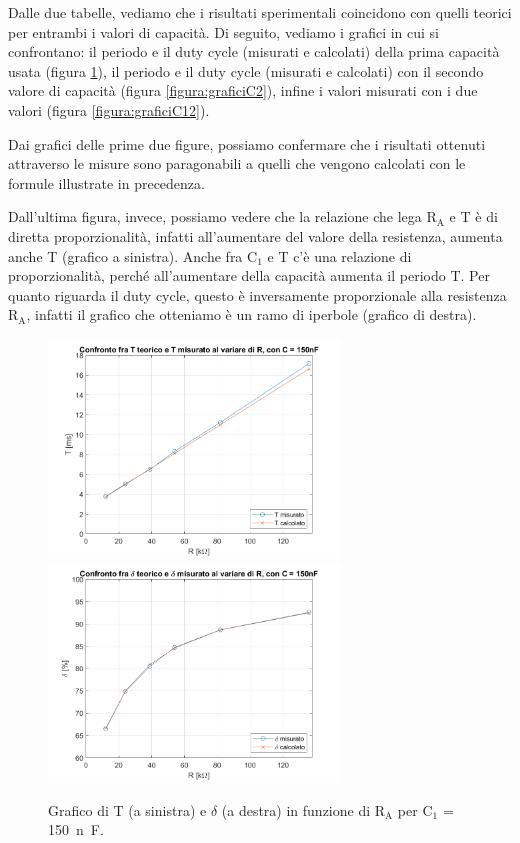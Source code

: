\documentclass{report}
\begin{document}
\newpage
Dalle due tabelle, vediamo che i risultati sperimentali coincidono con quelli teorici per entrambi i valori di capacità. Di seguito, vediamo i grafici in cui si confrontano: il periodo e il duty cycle (misurati e calcolati) della prima capacità usata (figura \ref{figura:graficiC1}), il periodo e il duty cycle (misurati e calcolati) con il secondo valore di capacità (figura \ref{figura:graficiC2}), infine i valori misurati con i due valori (figura \ref{figura:graficiC12}).\par 
Dai grafici delle prime due figure, possiamo confermare che i risultati ottenuti attraverso le misure sono paragonabili a quelli che vengono calcolati con le formule illustrate in precedenza. \par
Dall'ultima figura, invece, possiamo vedere che la relazione che lega $\mathrm{R_A}$ e T è di diretta proporzionalità, infatti all'aumentare del valore della resistenza, aumenta anche T (grafico a sinistra). Anche fra $\mathrm{C_1}$ e T c'è una relazione di proporzionalità, perché all'aumentare della capacità aumenta il periodo T. Per quanto riguarda il duty cycle, questo è inversamente proporzionale alla resistenza $\mathrm{R_A}$, infatti il grafico che otteniamo è un ramo di iperbole (grafico di destra).
\begin{figure}[h!]
	\centering
	\includegraphics[height=5.8cm]{immagini/graficoT1}
	\includegraphics[height=5.8cm]{immagini/graficoDC1}
	\caption{Grafico di T (a sinistra) e $\delta$ (a destra) in funzione di $\mathrm{R_A}$ per $\mathrm{C_1}$ = \SI{150}{n\farad}.}
	\label{figura:graficiC1}
\end{figure}
\end{document}
